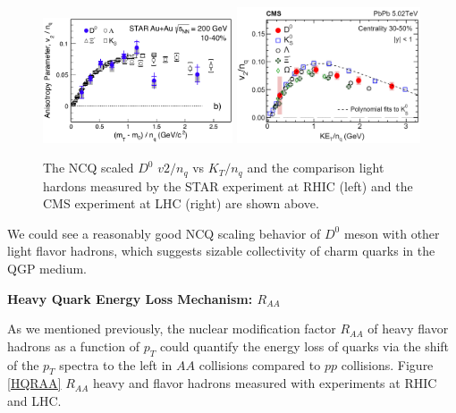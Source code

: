 \begin{figure}[hbtp]
\begin{center}
\includegraphics[width=0.50\textwidth]{Figures/Chapter1/STARv2.png}
\includegraphics[width=0.485\textwidth]{Figures/Chapter1/CMSv2.png}
\caption{The NCQ scaled $D^0$ $v2/n_q$ vs $K_T/n_q$ and the comparison light hardons measured by the STAR experiment at RHIC (left) and the CMS experiment at LHC (right) are shown above.}
\label{HQV2}
\end{center}
\end{figure}   

We could see a reasonably good NCQ scaling behavior of $D^0$ meson with other light flavor hadrons, which suggests sizable collectivity of charm quarks in the QGP medium.

\textbf{Heavy Quark Energy Loss Mechanism: $R_{AA}$}

As we mentioned previously, the nuclear modification factor $R_{AA}$ of heavy flavor hadrons as a function of $p_T$ could quantify the energy loss of quarks via the shift of the $p_T$ spectra to the left in $AA$ collisions compared to $pp$ collisions. Figure \ref{HQRAA} $R_{AA}$ heavy and flavor hadrons measured with experiments at RHIC and LHC.

